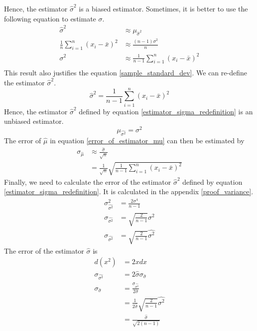 \documentclass[12pt,a4paper]{report}
\begin{document}
Hence, the estimator $\hat{\sigma}^2$ is a biased estimator. Sometimes, it is better to use the following equation to estimate $\sigma$.
\begin{align*}
\hat{\sigma}^2 &\approx \mu_{\hat{\sigma}^2} \\
\frac{1}{n} \sum_{i = 1}^{n} (x_i - \bar{x})^2 &\approx \frac{(n-1)\sigma^2}{n} \\
\sigma^2 &\approx \frac{1}{n-1} \sum_{i = 1}^{n} (x_i - \bar{x})^2 \\
\end{align*}
This result also justifies the equation \ref{sample_standard_dev}.
We can re-define the estimator $\hat{\sigma}^2$.
\begin{equation} \label{estimator_sigma_redefinition}
\hat{\sigma}^2 = \frac{1}{n-1} \sum_{i = 1}^{n} (x_i - \bar{x})^2
\end{equation}
Hence, the estimator $\hat{\sigma}^2$ defined by equation \ref{estimator_sigma_redefinition} is an unbiased estimator.
\begin{equation*}
\mu_{\hat{\sigma^2}} = \sigma^2
\end{equation*}
The error of $\hat{\mu}$ in equation \ref{error_of_estimator_mu} can then be estimated by
\begin{align*}
\sigma_{\hat{\mu}}
&\approx \frac{\hat{\sigma}}{\sqrt{n}} \\
&= \frac{1}{\sqrt{n}} \sqrt{ \frac{1}{n-1} \sum_{i = 1}^{n} (x_i - \bar{x})^2 }
\end{align*}
Finally, we need to calculate the error of the estimator $\hat{\sigma}^2$ defined by equation \ref{estimator_sigma_redefinition}. It is calculated in the appendix \ref{proof_variance}.
\begin{align*}
\sigma_{\hat{\sigma^2}}^2 &= \frac{2\sigma^4}{n-1} \\
\sigma_{\hat{\sigma^2}} &= \sqrt{\frac{2}{n-1}} \sigma^2 \\
\sigma_{\hat{\sigma^2}} &= \sqrt{\frac{2}{n-1}} \hat{\sigma^2}
\end{align*}
The error of the estimator $\hat{\sigma}$ is
\begin{align*}
d(x^2) &= 2x dx \\
\sigma_{\hat{\sigma^2}} &= 2 \hat{\sigma} \sigma_{\hat{\sigma}} \\
\sigma_{\hat{\sigma}} &= \frac{\sigma_{\hat{\sigma^2}}} {2 \hat{\sigma}} \\
&= \frac{1}{2\hat{\sigma}} \sqrt{\frac{2}{n-1}} \hat{\sigma^2} \\
&= \frac{\hat{\sigma}}{\sqrt{2(n-1)}}  \\
\end{align*}
\end{document}
